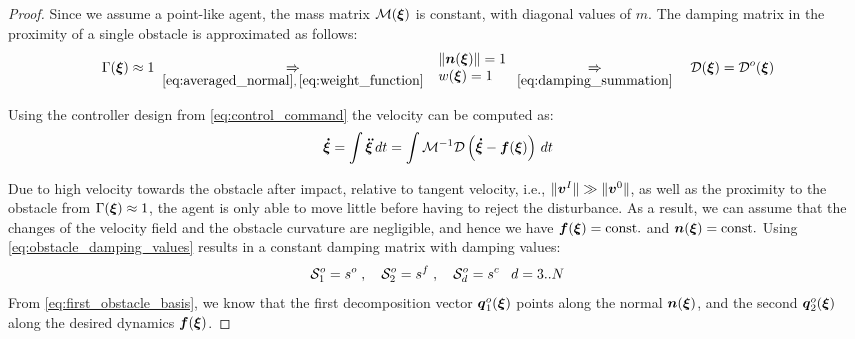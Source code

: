 \begin{proof}
Since we assume a point-like agent, the mass matrix $\mathcal{M}(\boldsymbol{\xi})$ is constant, with diagonal values of $m$. The damping matrix in the proximity of a single obstacle is approximated as follows:
\begin{equation}
\Gamma(\boldsymbol{\xi}) \approx 1
\; \underset{\eqref{eq:averaged_normal}, \, \eqref{eq:weight_function} } {\Rightarrow} \;
\begin{array}{l}
\| \boldsymbol{n}(\boldsymbol{\xi}) \| = 1 \\
w(\boldsymbol{\xi}) = 1
\end{array}
\underset{\eqref{eq:damping_summation}} {\Rightarrow} \quad
\mathcal{D}(\boldsymbol{\xi}) = \mathcal{D}^o(\boldsymbol{\xi})
\end{equation}

Using the controller design from \eqref{eq:control_command} the velocity can be computed as:
\begin{equation}
\begin{split}
    \vecs{\dot \xi} & = \int \vecs{\ddot \xi} \, dt 
    = \int \matd{M}^{-1} \matd{D}  \left( \vecs{\dot \xi} - \vecs f(\vecs \xi) \right) \, dt \\
\end{split}
\label{eq:velocity_evolution}
\end{equation}

Due to high velocity towards the obstacle after impact, relative to tangent velocity, i.e., $\| \boldsymbol{v}^I \| \gg \| \boldsymbol{v}^0 \|$, as well as the proximity to the obstacle from $\Gamma(\boldsymbol{\xi}) \approx 1$, the agent is only able to move little before having to reject the disturbance. 
As a result, we can assume that the changes of the velocity field and the obstacle curvature are negligible, and hence we have $\boldsymbol{f}(\boldsymbol{\xi}) = \text{const.}$ and $\boldsymbol{n}(\boldsymbol{\xi}) = \text{const.}$
Using \eqref{eq:obstacle_damping_values} results in a constant damping matrix with damping values:
\begin{equation}
    \mathcal{S}^o_1 = s^o
    \; , \quad
    \mathcal{S}^o_2 = s^f
    \; , \quad
    \mathcal{S}^o_d = s^c \;\;\; d = 3 .. N
\end{equation}
From \eqref{eq:first_obstacle_basis}, we know that the first decomposition vector $\boldsymbol{q}_1^o(\boldsymbol{\xi})$ points along the normal $\boldsymbol{n}(\boldsymbol{\xi})$, and the second $\boldsymbol{q}_2^o(\boldsymbol{\xi})$ along the desired dynamics $\boldsymbol{f}(\boldsymbol{\xi})$.


\end{proof}
